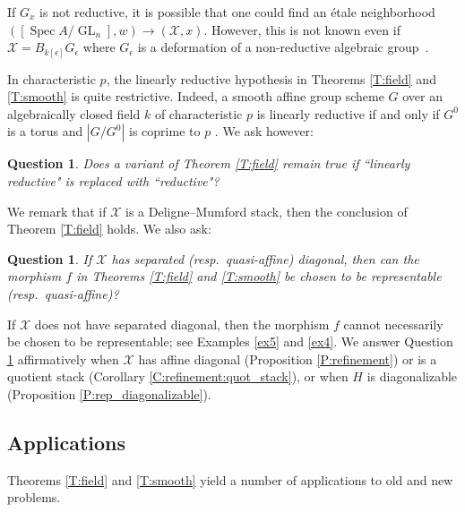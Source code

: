 \documentclass[a4paper]{amsart}
\theoremstyle{plain}
\newtheorem{question}[theorem]{Question}
\theoremstyle{definition}
\theoremstyle{remark}
\numberwithin{equation}{section}
\newcommand\cX{\mathcal{X}}
\DeclareMathOperator{\Spec}{Spec}
\DeclareMathOperator{\GL}{GL}
\begin{document}
If $G_x$ is not reductive, it is possible that one could find an \'etale
neighborhood $([\Spec A/\GL_n],w)\to (\cX,x)$. However, this is not known even if
$\cX=B_{k[\epsilon]}G_\epsilon$ where $G_\epsilon$ is a deformation of
a non-reductive algebraic group~\cite{mathoverflow_groups-over-dual-numbers}.

In characteristic $p$, the linearly reductive hypothesis in Theorems \ref{T:field} and \ref{T:smooth} is quite restrictive.  Indeed, a smooth affine group scheme $G$ over an algebraically closed field $k$ of characteristic $p$ is linearly reductive if and only if $G^0$ is a torus and $|G/G^0|$ is coprime to $p$ \cite{nagata}.  We ask however:

\begin{question} \label{Q:geom-red} Does a variant of Theorem \ref{T:field} remain true if ``linearly reductive" is replaced with ``reductive"?
\end{question}

We remark that if $\cX$ is a Deligne--Mumford stack, then the conclusion of Theorem \ref{T:field} holds. We also ask:
\begin{question}\label{Q:represent} If $\cX$ has separated (resp.\ quasi-affine) diagonal, then  can the morphism $f$ in Theorems \ref{T:field} and \ref{T:smooth} be chosen to be representable (resp.\ quasi-affine)?
\end{question} 

If $\cX$ does not have separated diagonal, then the morphism $f$ cannot
necessarily be chosen to be representable; see Examples \ref{ex5} and \ref{ex4}.
We answer Question \ref{Q:represent} affirmatively when $\cX$ has affine diagonal (Proposition \ref{P:refinement}) or is a quotient stack (Corollary \ref{C:refinement:quot_stack}), 
or when $H$ is
diagonalizable (Proposition \ref{P:rep_diagonalizable}).

\subsection{Applications} \label{S:intro-applications}
Theorems \ref{T:field}  and \ref{T:smooth}  yield a number of applications to old and new problems.
\end{document}
